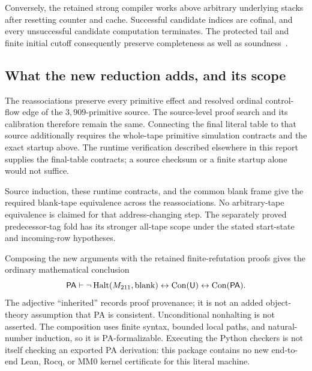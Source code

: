 Conversely, the retained strong compiler works above arbitrary underlying
stacks after resetting counter and cache. Successful candidate indices
are cofinal, and every unsuccessful candidate computation terminates.
The protected tail and finite initial cutoff consequently preserve
completeness as well as soundness~\cite{combined}.

\subsection{What the new reduction adds, and its scope}

The reassociations preserve every primitive effect and resolved ordinal
control-flow edge of the $3{,}909$-primitive source. The source-level
proof search and its calibration therefore remain the same. Connecting
the final literal table to that source additionally requires the
whole-tape primitive simulation contracts and the exact startup above.
The runtime verification described elsewhere in this report supplies
the final-table contracts; a source checksum or a finite startup alone
would not suffice.

Source induction, these runtime contracts, and the common blank frame
give the required blank-tape equivalence across the reassociations.
No arbitrary-tape equivalence is claimed for that address-changing step.
The separately proved predecessor-tag fold has its stronger all-tape
scope under the stated start-state and incoming-row hypotheses.

Composing the new arguments with the retained finite-refutation proofs
gives the ordinary mathematical conclusion
\[
 \mathsf{PA}\vdash
 \neg\operatorname{Halt}(M_{211},\mathrm{blank})
       \leftrightarrow\operatorname{Con}(\mathsf U)
       \leftrightarrow\operatorname{Con}(\mathsf{PA}).
\]
The adjective ``inherited'' records proof provenance; it is not an added
object-theory assumption that PA is consistent. Unconditional nonhalting
is not asserted. The composition uses finite syntax, bounded local paths,
and natural-number induction, so it is PA-formalizable. Executing the
Python checkers is not itself checking an exported PA derivation: this
package contains no new end-to-end Lean, Rocq, or MM0 kernel certificate
for this literal machine.
